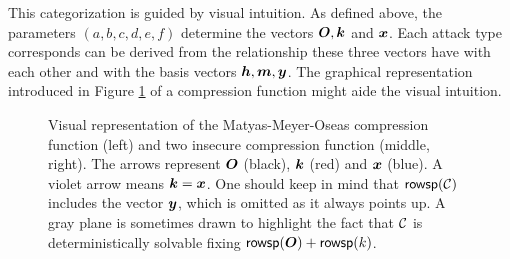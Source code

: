 This categorization is guided by visual intuition.
As defined above, the parameters $(a,b,c,d,e,f)$ determine the vectors $\boldsymbol{O}, \boldsymbol k$ and $\boldsymbol x$.
Each attack type corresponds can be derived from the relationship these three vectors have with each other and with the basis vectors $\boldsymbol h, \boldsymbol m, \boldsymbol y$.
The graphical representation introduced in Figure \ref{fig:graphical_rep} of a compression function might aide the visual intuition.
\begin{figure}[ht]
\centering

\hspace{0.5cm}
\hspace{0.5cm}
\caption{
Visual representation of the Matyas-Meyer-Oseas compression function (left) and two insecure compression function (middle, right).
The arrows represent $\boldsymbol{O}$ (black), $\boldsymbol k$ (red) and $\boldsymbol x$ (blue).
A violet arrow means $\boldsymbol k = \boldsymbol x$.
One should keep in mind that $\mathsf{rowsp}(\mathcal{C})$ includes the vector $\boldsymbol y$, which is omitted as it always points up.
A gray plane is sometimes drawn to highlight the fact that $\mathcal{C}$ is deterministically solvable fixing $\mathsf{rowsp}(\boldsymbol{O}) + \mathsf{rowsp}(k)$.
}
\label{fig:graphical_rep}
\end{figure}

